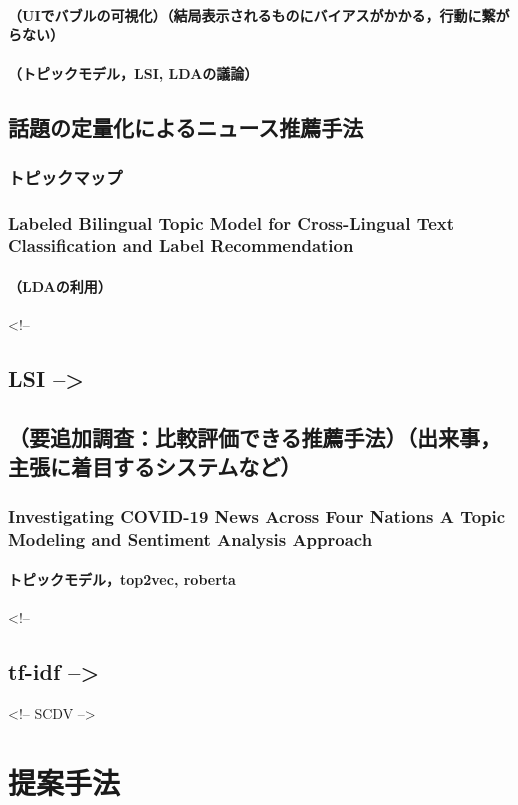 \documentclass[12pt,a4j]{jreport}
\begin{document}
        \subsubsection{（UIでバブルの可視化）（結局表示されるものにバイアスがかかる，行動に繋がらない）}
        \subsubsection{（トピックモデル，LSI, LDAの議論）}
\section{話題の定量化によるニュース推薦手法}
    \subsection{トピックマップ}
    \subsection{Labeled Bilingual Topic Model for Cross-Lingual Text Classification and Label Recommendation}
        \subsubsection{（LDAの利用）}
<!-- \section{LSI -->}
\section{（要追加調査：比較評価できる推薦手法）（出来事，主張に着目するシステムなど）}
    \subsection{Investigating COVID-19 News Across Four Nations A Topic Modeling and Sentiment Analysis Approach}
        \subsubsection{トピックモデル，top2vec, roberta}
    <!-- \section{tf-idf -->}
    <!-- SCDV -->


\chapter{提案手法}
\end{document}
